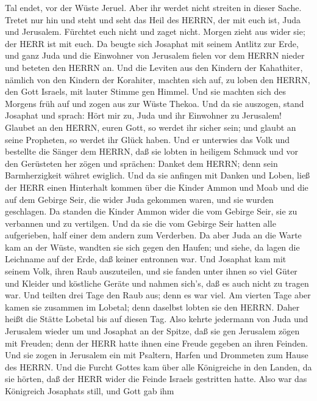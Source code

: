Tal endet, vor der Wüste Jeruel.  Aber ihr werdet nicht
streiten in dieser Sache. Tretet nur hin und steht und seht das Heil des
HERRN, der mit euch ist, Juda und Jerusalem. Fürchtet euch nicht und
zaget nicht. Morgen zieht aus wider sie; der HERR ist mit euch.
 Da beugte sich Josaphat mit seinem Antlitz zur Erde, und
ganz Juda und die Einwohner von Jerusalem fielen vor dem HERRN nieder
und beteten den HERRN an.  Und die Leviten aus den Kindern
der Kahathiter, nämlich von den Kindern der Korahiter, machten sich auf,
zu loben den HERRN, den Gott Israels, mit lauter Stimme gen Himmel.
 Und sie machten sich des Morgens früh auf und zogen aus
zur Wüste Thekoa. Und da sie auszogen, stand Josaphat und sprach: Hört
mir zu, Juda und ihr Einwohner zu Jerusalem! Glaubet an den HERRN, euren
Gott, so werdet ihr sicher sein; und glaubt an seine Propheten, so
werdet ihr Glück haben.  Und er unterwies das Volk und
bestellte die Sänger dem HERRN, daß sie lobten in heiligem Schmuck und
vor den Gerüsteten her zögen und sprächen: Danket dem HERRN; denn sein
Barmherzigkeit währet ewiglich.  Und da sie anfingen mit
Danken und Loben, ließ der HERR einen Hinterhalt kommen über die Kinder
Ammon und Moab und die auf dem Gebirge Seir, die wider Juda gekommen
waren, und sie wurden geschlagen.  Da standen die Kinder
Ammon wider die vom Gebirge Seir, sie zu verbannen und zu vertilgen. Und
da sie die vom Gebirge Seir hatten alle aufgerieben, half einer dem
andern zum Verderben.  Da aber Juda an die Warte kam an der
Wüste, wandten sie sich gegen den Haufen; und siehe, da lagen die
Leichname auf der Erde, daß keiner entronnen war.  Und
Josaphat kam mit seinem Volk, ihren Raub auszuteilen, und sie fanden
unter ihnen so viel Güter und Kleider und köstliche Geräte und nahmen
sich's, daß es auch nicht zu tragen war. Und teilten drei Tage den Raub
aus; denn es war viel.  Am vierten Tage aber kamen sie
zusammen im Lobetal; denn daselbst lobten sie den HERRN. Daher heißt die
Stätte Lobetal bis auf diesen Tag.  Also kehrte jedermann
von Juda und Jerusalem wieder um und Josaphat an der Spitze, daß sie gen
Jerusalem zögen mit Freuden; denn der HERR hatte ihnen eine Freude
gegeben an ihren Feinden.  Und sie zogen in Jerusalem ein
mit Psaltern, Harfen und Drommeten zum Hause des HERRN. 
Und die Furcht Gottes kam über alle Königreiche in den Landen, da sie
hörten, daß der HERR wider die Feinde Israels gestritten hatte.
 Also war das Königreich Josaphats still, und Gott gab ihm
